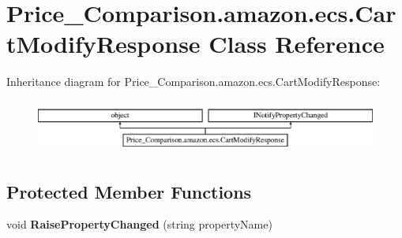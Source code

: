 \hypertarget{class_price___comparison_1_1amazon_1_1ecs_1_1_cart_modify_response}{\section{Price\-\_\-\-Comparison.\-amazon.\-ecs.\-Cart\-Modify\-Response Class Reference}
\label{class_price___comparison_1_1amazon_1_1ecs_1_1_cart_modify_response}
}


 


Inheritance diagram for Price\-\_\-\-Comparison.\-amazon.\-ecs.\-Cart\-Modify\-Response\-:\begin{figure}[H]
\begin{center}
\leavevmode
\includegraphics[height=1.766562cm]{class_price___comparison_1_1amazon_1_1ecs_1_1_cart_modify_response}
\end{center}
\end{figure}
\subsection*{Protected Member Functions}
\begin{DoxyCompactItemize}
\item 
\hypertarget{class_price___comparison_1_1amazon_1_1ecs_1_1_cart_modify_response_a15c599acf4908ffc4a51a2d365c5478b}{void {\bfseries Raise\-Property\-Changed} (string property\-Name)}\label{class_price___comparison_1_1amazon_1_1ecs_1_1_cart_modify_response_a15c599acf4908ffc4a51a2d365c5478b}

\end{DoxyCompactItemize}
